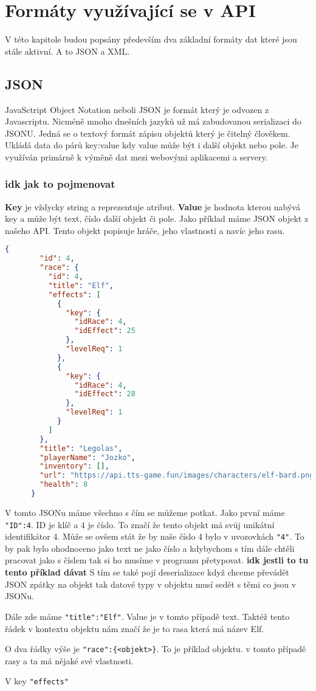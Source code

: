 \chapter{Formáty využívající se v API}
V této kapitole budou popsány především dva základní formáty dat které jsou stále aktivní. A to JSON a XML.

\section{JSON}
JavaSctript Object Notation neboli JSON je formát který je odvozen z Javascriptu. Nicméně mnoho dnešních jazyků už má zabudovanou serializaci do JSONU. Jedná se o textový formát zápisu objektů který je čitelný člověkem. Ukládá data do párů key:value kdy value může být i další objekt nebo pole. Je využíván primárně k výměně dat mezi webovými aplikacemi a servery.

\subsection{idk jak to pojmenovat}
\textbf{Key} je vždycky string a reprezentuje atribut. \textbf{Value} je hodnota kterou nabývá key a může být text, číslo další objekt či pole. Jako příklad máme JSON objekt z našeho API. Tento objekt popisuje hráče, jeho vlastnosti a navíc jeho rasu.
\begin{lstlisting}[language=json, caption=Příklad JSON dokumentu]
    {
        "id": 4,
        "race": {
          "id": 4,
          "title": "Elf",
          "effects": [
            {
              "key": {
                "idRace": 4,
                "idEffect": 25
              },
              "levelReq": 1
            },
            {
              "key": {
                "idRace": 4,
                "idEffect": 28
              },
              "levelReq": 1
            }
          ]
        },
        "title": "Legolas",
        "playerName": "Jozko",
        "inventory": [],
        "url": "https://api.tts-game.fun/images/characters/elf-bard.png",
        "health": 8
      }
\end{lstlisting}

V tomto JSONu máme všechno s čím se můžeme potkat. Jako první máme \verb|"ID":4|. ID je klíč a 4 je číslo. To značí že tento objekt má svůj unikátní identifikátor 4. Může se ovšem stát že by naše číslo 4 bylo v uvozovkách \verb|"4"|. To by pak bylo ohodnoceno jako text ne jako číslo a kdybychom s tím dále chtěli pracovat jako s číslem tak si ho musíme v programu přetypovat. \textbf{idk jestli to tu tento příklad dávat }S tím se také pojí deserializace když chceme převádět JSON zpátky na objekt tak datové typy v objektu musí sedět s těmi co jsou v JSONu.

Dále zde máme \verb|"title":"Elf"|. Value je v tomto případě text. Taktéž tento řádek v kontextu objektu nám značí že je to rasa která má název Elf.

O dva řádky výše je \verb|"race":{<objekt>}|. To je příklad objektu. v tomto případě rasy a ta má nějaké své vlastnosti.

V key \texttt{"effects"}


\endinput